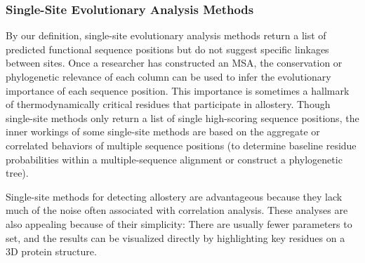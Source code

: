\subsubsection{Single-Site Evolutionary Analysis Methods}
\par By our definition, single-site evolutionary analysis methods return a list of predicted functional sequence positions but do not suggest specific linkages between sites. Once a researcher has constructed an MSA, the conservation or phylogenetic relevance of each column can be used to infer the evolutionary importance of each sequence position. This importance is sometimes a hallmark of thermodynamically critical residues that participate in allostery. Though single-site methods only return a list of single high-scoring sequence positions, the inner workings of some single-site methods are based on the aggregate or correlated behaviors of multiple sequence positions (\eg to determine baseline residue probabilities within a multiple-sequence alignment or construct a phylogenetic tree).
\par Single-site methods for detecting allostery are advantageous because they lack much of the noise often associated with correlation analysis. These analyses are also appealing because of their simplicity: There are usually fewer parameters to set, and the results can be visualized directly by highlighting key residues on a 3D protein structure.
